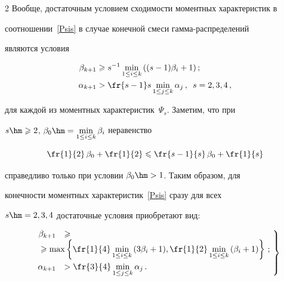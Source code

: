 \begin{multicols}{2}
Вообще, достаточным условием сходимости моментных характеристик в

соотношении~\eqref{Psis} в случае конечной смеси гам\-ма-рас\-пре\-де\-ле\-ний

являются условия

\begin{align*}

\beta_{k+1}&\geqslant s^{-1}\min\limits_{1\le i\le

k}{((s-1)\beta_i+1)}\,;\\

\alpha_{k+1}&>\fr{s-1}s\min\limits_{1\le j\le k}{\alpha_j}\,,\enskip s=2,3,4\,,

\end{align*}

для каждой из моментных характеристик~$\Psi_s$. Заметим, что при

$s\hm\geqslant2$, $\beta_0\hm=\min\limits_{1\le i\le k}{\beta_i}$ неравенство

$$

\fr{1}{2}\,\beta_0+\fr{1}{2}\leqslant\fr{s-1}{s}\,\beta_0+\fr{1}{s}

$$

справедливо только при условии $\beta_0\hm>1$. Таким образом, для

конечности моментных характеристик~\eqref{Psis} сразу для всех

$s\hm=2,3,4$ достаточные условия приобретают вид:

\begin{equation}

\left.

\begin{array}{rl}

\beta_{k+1}&\geqslant\\

&\!\!\!\!\!\!\!\!\!\!\!\!\!\!\!\!\!\geqslant\max\left\{\fr{1}{4}\min\limits_{1\le

i\le k}{(3\beta_i+1)},\fr{1}{2}\min\limits_{1\le i\le

k}{(\beta_i+1)}\right\}\,;\\[9pt]

\alpha_{k+1}&>\fr{3}{4}\min\limits_{1\le j\le

k}{\alpha_j}\,.

\end{array}\!

\right\}\!\!

\label{CondPsiGamma}

\end{equation}




\end{multicols}

